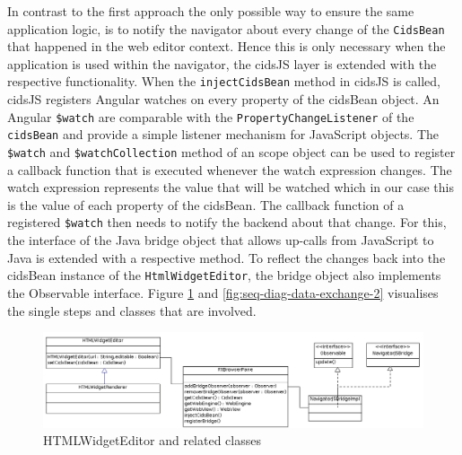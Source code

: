 In contrast to the first approach the only possible way to ensure the same application logic, is to notify the navigator about every change of the \texttt{CidsBean} that happened in the web editor context.
Hence this is only necessary when the application is used within the navigator, the cidsJS layer is extended with the respective functionality.
When the \texttt{injectCidsBean} method in cidsJS is called, cidsJS registers Angular watches on every property of the cidsBean object.
An Angular \texttt{\$watch} are comparable with the \texttt{PropertyChangeListener} of the \texttt{cidsBean} and provide a simple listener mechanism for JavaScript objects.
The \texttt{\$watch} and \texttt{\$watchCollection} method of an scope object can be used to register a callback function that is executed whenever the watch expression changes.
The watch expression represents the value that will be watched which in our case this is the value of each property of the cidsBean.
The callback function of a registered  \texttt{\$watch} then needs to notify the backend about that change.
For this, the interface of the Java bridge object that allows up-calls from JavaScript to Java is extended with a respective method.
To reflect the changes back into the cidsBean instance of the \texttt{HtmlWidgetEditor}, the bridge object also implements the Observable interface. Figure \ref{fig:class_diag_html_widget_editor} and \ref{fig:seq-diag-data-exchange-2} visualises the single steps and classes that are involved.

\begin{figure}
	\centering	\includegraphics[width=1.0\textwidth]{./img/classDiagramms/html_editor.png}
	\caption{HTMLWidgetEditor and related classes}
	\label{fig:class_diag_html_widget_editor}
\end{figure}



